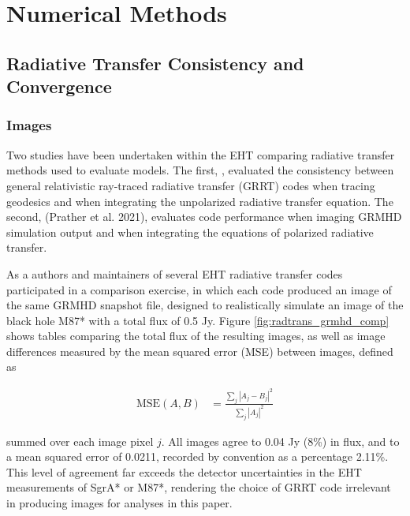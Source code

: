 \section{Numerical Methods}\label{app:numerical}



\subsection{Radiative Transfer Consistency and Convergence}
\label{app:radtrans}

\subsubsection{Images}


Two studies have been undertaken within the EHT comparing radiative transfer methods used to evaluate models.  The first, \cite{2020ApJ...897..148G}, evaluated the consistency between general relativistic ray-traced radiative transfer (GRRT) codes when tracing geodesics and when integrating the unpolarized radiative transfer equation.  The second, (Prather et al. 2021), evaluates code performance when imaging GRMHD simulation output and when integrating the equations of polarized radiative transfer.

As a  authors and maintainers of several EHT radiative transfer codes participated in a comparison exercise, in which each code produced an image of the same GRMHD snapshot file, designed to realistically simulate an image of the black hole M87* with a total flux of 0.5 Jy.  Figure \ref{fig:radtrans_grmhd_comp} shows tables comparing the total flux of the resulting images, as well as image differences measured by the mean squared error (MSE) between images, defined as

\begin{align}
    \mathrm{MSE}(A, B) &= \frac{\sum_j|A_j-B_j|^2}{\sum_j|A_j|^2}
\end{align}

summed over each image pixel $j$. All images agree to 0.04 Jy (8\%) in flux, and to a mean squared error of 0.0211, recorded by convention as a percentage 2.11\%.  This level of agreement far exceeds the detector uncertainties in the EHT measurements of SgrA* or M87*, rendering the choice of GRRT code irrelevant in producing images for analyses in this paper.

